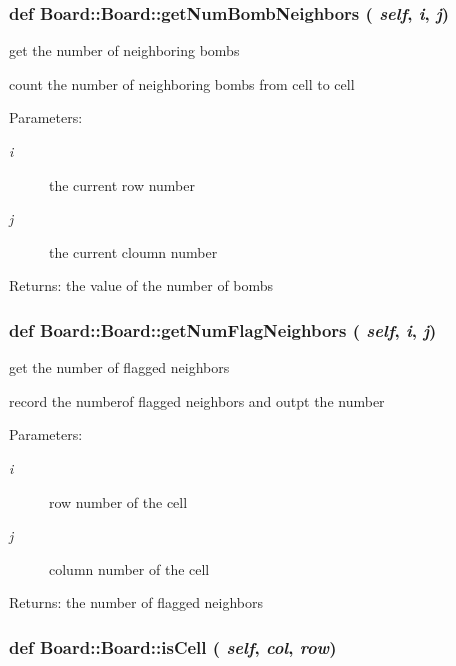 \subsubsection{\setlength{\rightskip}{0pt plus 5cm}def Board::Board::get\-Num\-Bomb\-Neighbors ( {\em self},  {\em i},  {\em j})}\label{classBoard_1_1Board_7b7f8d47686b02ed54c31b9dbbdcd53b}


get the number of neighboring bombs 

count the number of neighboring bombs from cell to cell \begin{Desc}
\item[Parameters:]
\begin{description}
\item[{\em i}]the current row number \item[{\em j}]the current cloumn number \end{description}
\end{Desc}
\begin{Desc}
\item[Returns:]the value of the number of bombs \end{Desc}
\subsubsection{\setlength{\rightskip}{0pt plus 5cm}def Board::Board::get\-Num\-Flag\-Neighbors ( {\em self},  {\em i},  {\em j})}\label{classBoard_1_1Board_ac4138cfb502078f2dcc1a596f408cb6}


get the number of flagged neighbors 

record the numberof flagged neighbors and outpt the number \begin{Desc}
\item[Parameters:]
\begin{description}
\item[{\em i}]row number of the cell \item[{\em j}]column number of the cell \end{description}
\end{Desc}
\begin{Desc}
\item[Returns:]the number of flagged neighbors \end{Desc}
\subsubsection{\setlength{\rightskip}{0pt plus 5cm}def Board::Board::is\-Cell ( {\em self},  {\em col},  {\em row})}\label{classBoard_1_1Board_ec8ef42706f1a5126698f25fe8f38f9a}


